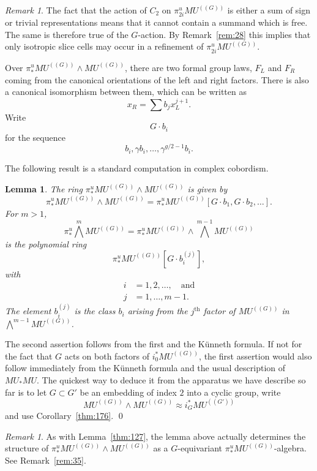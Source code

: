 \documentclass{amsart}
\newtheorem{lem}[equation]{Lemma}
\newtheorem{rem}[equation]{Remark}
\theoremstyle{definition}
\theoremstyle{remark}
\newtheorem{rem}[equation]{Remark}
\newenvironment{pf}{\bigskip{\em Proof:\/}}{\qed\medskip}
\newcommand{\mutn}[1]{MU^{(\!(#1)\!)}}
\newcommand{\piu}{\pi^{u}}
\newcommand{\zt}{C_{2}}
\newcommand{\mustarmu}{MU_{\ast}MU}
\begin{document}
\begin{rem}
\label{rem:41} The fact that the action of $\zt$ on
$\piu_{2i}\mutn{G}$ is either a sum of sign or trivial representations
means that it cannot contain a summand which is free.  The same is
therefore true of the $G$-action.  By Remark~\ref{rem:28} this implies
that only isotropic slice cells may occur in a refinement of
$\piu_{2i}\mutn{G}$.
\end{rem}


Over $\piu_{\ast}\mutn{G}\wedge \mutn{G}$, there are two formal group
laws, $F_{L}$ and $F_{R}$ coming from the canonical orientations of
the left and right factors.   There is also a canonical isomorphism
between them, which can be written as
\[
x_{R} = \sum b_{j}x_{L}^{j+1}.
\]
Write
\[
G\cdot b_{i}
\]
for the sequence
\[
b_{i}, \gamma b_{i},\dots,\gamma^{g/2-1}b_{i}.
\]

The following result is a standard computation in complex cobordism.

\begin{lem}
\label{thm:173}
The ring $\piu_{\ast}\mutn{G}\wedge \mutn{G}$ is given by
\[
\piu_{\ast}\mutn{G}\wedge \mutn{G} = \piu_{\ast}\mutn{G}[G\cdot
b_{1},G\cdot b_{2},\dots].
\]
For $m>1$,
\[
\piu_{\ast}\bigwedge^{m}\mutn{G}
=
\piu_{\ast}\mutn{G}\wedge \bigwedge^{m-1}\mutn{G}
\]
is the polynomial ring
\[
\piu_{\ast}\mutn{G}[G\cdot  b_{i}^{(j)} ],
\]
with
\begin{align*}
i&=1,2,\dots,\quad\text{and} \\ j&=1,\dots,m-1.
\end{align*}
The element $b_{i}^{(j)}$ is the class $b_{i}$ arising from the
$j^{\text{th}}$ factor of $\mutn{G}$ in $\bigwedge^{m-1}\mutn{G}$.
\end{lem}

\begin{pf}
The second assertion follows from the first and the K\"unneth formula.
If not for the fact that $G$ acts on both factors of
$i_{0}^{\ast}\mutn{G}$, the first assertion would also follow
immediately from the K\"unneth formula and the usual description of
$\mustarmu$.  The quickest way to deduce it from the apparatus we have
describe so far is to let $G\subset G'$ be an embedding of index $2$
into a cyclic group, write
\[
\mutn{G}\wedge \mutn{G} \approx i_{G}^{\ast}\mutn{G'}
\]
and use Corollary~\ref{thm:176}.   
\end{pf}


\begin{rem}
\label{rem:36} 
As with Lemma~\ref{thm:127}, the lemma above actually
determines the structure of $\piu_{\ast}\mutn{G}\wedge \mutn{G}$ as a
$G$-equivariant $\piu_{\ast}\mutn{G}$-algebra.  See
Remark~\ref{rem:35}.
\end{rem}
\end{document}
